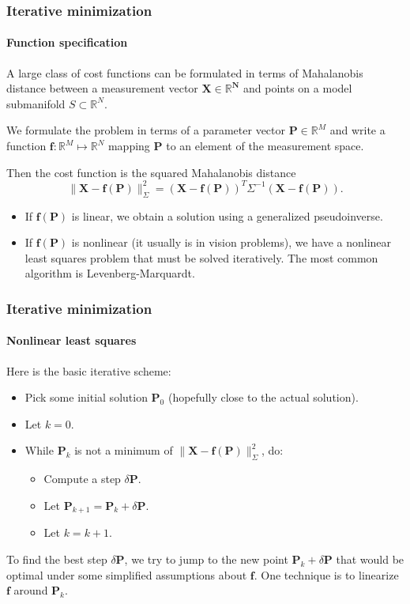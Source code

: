 \documentclass[aspectratio=169]{beamer}
\renewcommand{\vec}[1]{\boldsymbol{#1}}
\def\Rset{\mathbb{R}}
\begin{document}
\begin{frame}
\frametitle{Iterative minimization}
\framesubtitle{Function specification}

A large class of cost functions can be formulated in terms of
\alert{Mahalanobis distance} between a \alert{measurement vector}
$\vec{X \in \Rset^N}$ and points on a \alert{model} submanifold $S
\subset \Rset^N$.

\medskip

We formulate the problem in terms of a \alert{parameter vector}
$\vec{P} \in \Rset^M$ and write a function $\vec{f} : \Rset^M \mapsto
\Rset^N$ mapping $\vec{P}$ to an element of the measurement space.

\medskip

Then the cost function is the squared Mahalanobis distance
\begin{equation*}
\| \vec{X} - \vec{f}(\vec{P})\|^2_{\Sigma} =
(\vec{X}-\vec{f}(\vec{P}))^T \Sigma^{-1} (\vec{X}-\vec{f}(\vec{P})).
\end{equation*}
\begin{itemize}
\item If $\vec{f}(\vec{P})$ is \alert{linear}, we obtain a solution using a
  generalized pseudoinverse.
\item If $\vec{f}(\vec{P})$ is \alert{nonlinear} (it usually is in vision
  problems), we have a \alert{nonlinear least squares} problem that
  must be solved iteratively.  The most common algorithm is
  \alert{Levenberg-Marquardt}.
\end{itemize}

\end{frame}

\begin{frame}
\frametitle{Iterative minimization}
\framesubtitle{Nonlinear least squares}

Here is the basic iterative scheme:
\begin{itemize}
\item Pick some initial solution $\vec{P}_0$ (hopefully close to the
  actual solution).
\item Let $k=0$.
\item While $\vec{P}_k$ is not a minimum of $\|\vec{X}-\vec{f}(\vec{P})\|^2_{\Sigma}$, do:
  \begin{itemize}
  \item Compute a step $\delta\vec{P}$.
  \item Let $\vec{P}_{k+1} = \vec{P}_{k} + \delta\vec{P}$.
  \item Let $k=k+1$.
  \end{itemize}
\end{itemize}

To find the best step $\delta\vec{P}$, we try to jump to the new point
$\vec{P}_k+\delta{\vec{P}}$ that would be optimal under some
simplified assumptions about $\vec{f}$.  One technique is to
\alert{linearize} $\vec{f}$ around $\vec{P}_k$.

\end{frame}
\end{document}
